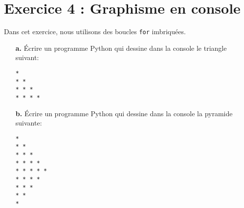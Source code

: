 \documentclass[a4paper,11pt]{article}
\theoremstyle{mytheor}
\begin{document}
\clearpage

\section*{Exercice 4 : Graphisme en console}
Dans cet exercice, nous utilisons des boucles \lstinline|for| imbriquées.
\begin{itemize}
	\item[\textbf{a.}] Écrire un programme Python qui dessine dans la console le triangle suivant: 
\begin{Verbatim}[frame=leftline, framerule=1.5mm, rulecolor=\color{blue}]
* 
* * 
* * * 
* * * * 
\end{Verbatim}
\item[\textbf{b.}] Écrire un programme Python qui dessine dans la console la pyramide suivante: 
\begin{Verbatim}[frame=leftline, framerule=1.5mm, rulecolor=\color{blue}]
* 
* * 
* * * 
* * * * 
* * * * * 
* * * * 
* * * 
* * 
* 
\end{Verbatim}
\end{itemize}
\end{document}
